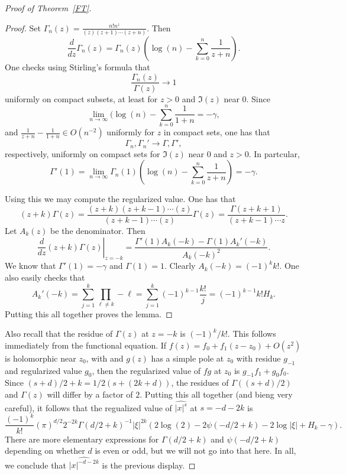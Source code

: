 \documentclass[12pt]{article}
\begin{document}
\begin{proof}[Proof of Theorem~\ref{FT}]
\begin{proof}
Set $\Gamma_n(z) = \frac{n!n^z}{(z)(z+1)\cdots (z+n)}$. Then
\[\frac{d}{dz} \Gamma_n(z) = \Gamma_n(z)\left(\log(n)-\sum_{k=0}^n \frac{1}{z+n}\right).\]
One checks using Stirling's formula that
\[\frac{\Gamma_n(z)}{\Gamma(z)} \to 1\] uniformly on compact subsets, at least for $z > 0$ and $\Im (z)$ near $0$. Since
\[\lim_{n \to \infty} (\log(n)-\sum_{k=0}^n \frac{1}{1+n} = -\gamma,\] and $\frac{1}{z+n}-\frac{1}{1+n} \in O(n^{-2})$ uniformly for $z$ in compact sets, one has that \[\Gamma_n,\Gamma_n' \to \Gamma, \Gamma',\] respectively, uniformly on compact sets for $\Im(z)$ near $0$ and $z > 0$. In partcular,
\[\Gamma'(1) = \lim_{n \to \infty} \Gamma_n(1)\left(\log(n)-\sum_{k=0}^n \frac{1}{z+n}\right) = -\gamma.\]

Using this we may compute the regularized value. One has that
\[(z+k)\Gamma(z) = \frac{(z+k)(z+k-1)\cdots(z)}{(z+k-1)\cdots(z)}\Gamma(z) = \frac{\Gamma(z+k+1)}{(z+k-1)\cdots z}.\]
Let $A_k(z)$ be the denominator. Then
\[\left.\frac{d}{dz} (z+k)\Gamma(z)\right|_{z=-k} = \frac{\Gamma'(1)A_k(-k) - \Gamma(1)A_k'(-k)}{A_k(-k)^2}.\]
We know that $\Gamma'(1) = -\gamma$ and $\Gamma(1) = 1$. Clearly $A_k(-k) = (-1)^kk!$. One also easily checks that
\[A_k'(-k) = \sum_{j=1}^k\prod_{\ell \neq k} -\ell = \sum_{j=1}^k (-1)^{k-1}\frac{k!}{j} = (-1)^{k-1}k!H_k.\] Putting this all together proves the lemma.\end{proof}

Also recall that the residue of $\Gamma(z)$ at $z = -k$ is $(-1)^k/k!$. This follows immediately from the functional equation.
If $f(z) = f_0 + f_1(z-z_0) + O(z^2)$ is holomorphic near $z_0$, with and $g(z)$ has a simple pole at $z_0$ with residue $g_{-1}$ and regularized value $g_0$, then the regularized value of $fg$ at $z_0$ is $g_{-1}f_1 + g_0f_0$. Since $(s+d)/2+k = 1/2(s+(2k+d))$, the residues of $\Gamma((s+d)/2)$ and $\Gamma(z)$ will differ by a factor of $2$. Putting this all together (and bieng very careful), it follows that the regualized value of $\widehat{|x|^{s}}$ at $s=-d-2k$ is
\[\frac{(-1)^k}{k!}(\pi)^{d/2}2^{-2k}\Gamma(d/2+k)^{-1}|\xi|^{2k}\left(2\log(2)-2\psi(-d/2+k)-2\log|\xi| + H_k-\gamma\right).\]
There are more elementary expressions for $\Gamma(d/2+k)$ and $\psi(-d/2+k)$ depending on whether $d$ is even or odd, but we will not go into that here. In all, we conclude that $\widehat{|x|^{-d-2k}}$ is the previous display.
\end{proof}
\end{document}
